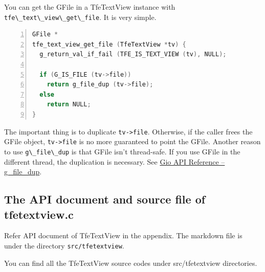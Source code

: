 You can get the GFile in a TfeTextView instance with
\passthrough{\lstinline!tfe\_text\_view\_get\_file!}. It is very simple.

\begin{lstlisting}[language=C, numbers=left]
GFile *
tfe_text_view_get_file (TfeTextView *tv) {
  g_return_val_if_fail (TFE_IS_TEXT_VIEW (tv), NULL);

  if (G_IS_FILE (tv->file))
    return g_file_dup (tv->file);
  else
    return NULL;
}
\end{lstlisting}

The important thing is to duplicate \passthrough{\lstinline!tv->file!}.
Otherwise, if the caller frees the GFile object,
\passthrough{\lstinline!tv->file!} is no more guaranteed to point the
GFile. Another reason to use \passthrough{\lstinline!g\_file\_dup!} is
that GFile isn't thread-safe. If you use GFile in the different thread,
the duplication is necessary. See
\href{https://docs.gtk.org/gio/method.File.dup.html}{Gio API Reference
-- g\_file\_dup}.

\subsection{The API document and source file of
tfetextview.c}\label{the-api-document-and-source-file-of-tfetextview.c}

Refer API document of TfeTextView in the appendix. The markdown file is
under the directory \passthrough{\lstinline!src/tfetextview!}.

You can find all the TfeTextView source codes under src/tfetextview
directories.
